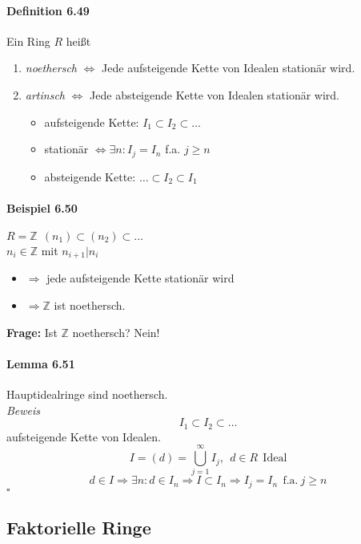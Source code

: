 \documentclass{scrartcl}
\begin{document}
\paragraph{Definition 6.49}
Ein Ring $R$ heißt
\begin{enumerate}
\item \textit{noethersch} $\Leftrightarrow$ Jede aufsteigende Kette von Idealen
  stationär wird.
\item \textit{artinsch} $\Leftrightarrow $ Jede absteigende Kette von Idealen
  stationär wird.
  \begin{itemize}
  \item aufsteigende Kette: $I_1 \subset I_2 \subset \dots$
  \item stationär $\Leftrightarrow \exists n: I_j = I_n$ f.a. $j \geq n$
  \item absteigende Kette: $\dots \subset I_2 \subset I_1$
\end{itemize}
\end{enumerate}

\paragraph{Beispiel 6.50}
$R = \mathbb{Z} ~~ (n_1) \subset (n_2) \subset \dots$ \\
$n_i \in \mathbb{Z}$ mit $n_{i+1}|n_i$ \\
\begin{itemize}
 \item $\Rightarrow$ jede aufsteigende Kette stationär wird
\item $\Rightarrow \mathbb{Z}$ ist noethersch.
\end{itemize}
\textbf{Frage:} Ist $\mathbb{Z}$ noethersch? Nein!

\paragraph{Lemma 6.51}
Hauptidealringe sind noethersch. \\
\textit{Beweis} \\
\[
  I_1 \subset I_2 \subset \dots
\]
aufsteigende Kette von Idealen.
\[
  I = (d) = \bigcup_{j = 1}^\infty I_j, ~~ d \in R ~~ \text{Ideal}
\]
\[
  d \in I \Rightarrow \exists n: d \in I_n \Rightarrow  I \subset I_n
  \Rightarrow I_j = I_n ~~ \text{f.a.} ~ j \geq n 
\]
\hfill $\square$

\subsection{Faktorielle Ringe}
\label{subsec:faktorielleringe}
\end{document}

